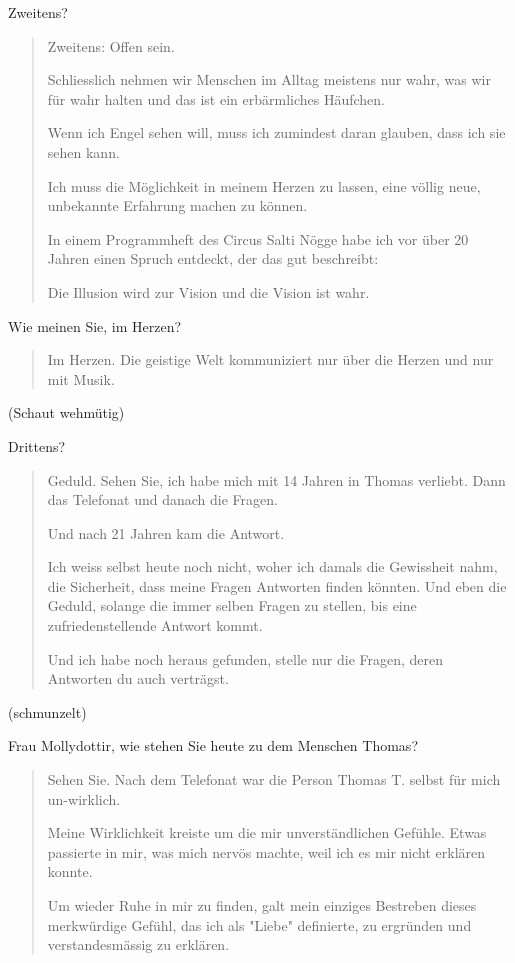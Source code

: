 \documentclass[10pt,titlepage,a5paper]{book}
\newenvironment{tg}{\begin{quote}\em}{\end{quote}}
\begin{document}
Zweitens?

\begin{tg}

Zweitens: Offen sein.

Schliesslich nehmen wir Menschen im Alltag meistens nur wahr, was wir für wahr halten und das ist ein erbärmliches Häufchen.

Wenn ich Engel sehen will, muss ich zumindest daran glauben, dass ich sie sehen kann.

Ich muss die Möglichkeit in meinem Herzen zu lassen, eine völlig neue, unbekannte Erfahrung machen zu können.

In einem Programmheft des Circus Salti Nögge habe ich vor über 20 Jahren einen Spruch entdeckt, der das gut beschreibt:

Die Illusion wird zur Vision und die Vision ist wahr.

\end{tg}

Wie meinen Sie, im Herzen?

\begin{tg}

Im Herzen. Die geistige Welt kommuniziert nur über die Herzen und nur mit Musik.

\end{tg}

(Schaut wehmütig)

Drittens?

\begin{tg}

Geduld. Sehen Sie, ich habe mich mit 14 Jahren in Thomas verliebt. Dann das Telefonat und danach die Fragen. 

Und nach 21 Jahren kam die Antwort.

Ich weiss selbst heute noch nicht, woher ich damals die Gewissheit nahm, die Sicherheit, dass meine Fragen Antworten finden könnten. Und eben die Geduld, solange die immer selben Fragen zu stellen, bis eine zufriedenstellende Antwort kommt.

Und ich habe noch heraus gefunden, stelle nur die Fragen, deren Antworten du auch verträgst.

\end{tg}

(schmunzelt)

Frau Mollydottir, wie stehen Sie heute zu dem Menschen Thomas?

\begin{tg}

Sehen Sie. Nach dem Telefonat war die Person Thomas T. selbst für mich un-wirklich. 

Meine Wirklichkeit kreiste um die mir unverständlichen Gefühle. Etwas passierte in mir, was mich nervös machte, weil ich es mir nicht erklären konnte.

Um wieder Ruhe in mir zu finden, galt mein einziges Bestreben dieses merkwürdige Gefühl, das ich als "Liebe" definierte, zu ergründen und verstandesmässig zu erklären.

\end{tg}
\end{document}
